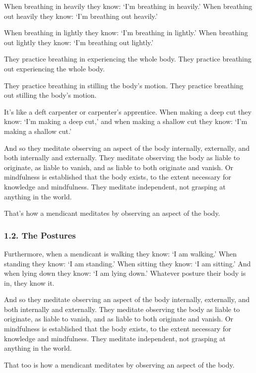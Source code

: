 \documentclass[12pt,openany]{book}%
\begin{document}
When breathing in heavily they know: ‘I’m breathing in heavily.’ When breathing out heavily they know: ‘I’m breathing out heavily.’ 

When breathing in lightly they know: ‘I’m breathing in lightly.’ When breathing out lightly they know: ‘I’m breathing out lightly.’ 

They practice breathing in experiencing the whole body. They practice breathing out experiencing the whole body. 

They practice breathing in stilling the body’s motion. They practice breathing out stilling the body’s motion. 

It’s like a deft carpenter or carpenter’s apprentice. When making a deep cut they know: ‘I’m making a deep cut,’ and when making a shallow cut they know: ‘I’m making a shallow cut.’ 

And so they meditate observing an aspect of the body internally, externally, and both internally and externally. They meditate observing the body as liable to originate, as liable to vanish, and as liable to both originate and vanish. Or mindfulness is established that the body exists, to the extent necessary for knowledge and mindfulness. They meditate independent, not grasping at anything in the world. 

That’s how a mendicant meditates by observing an aspect of the body. 

\subsubsection*{1.2. The Postures }

Furthermore, when a mendicant is walking they know: ‘I am walking.’ When standing they know: ‘I am standing.’ When sitting they know: ‘I am sitting.’ And when lying down they know: ‘I am lying down.’ Whatever posture their body is in, they know it. 

And so they meditate observing an aspect of the body internally, externally, and both internally and externally. They meditate observing the body as liable to originate, as liable to vanish, and as liable to both originate and vanish. Or mindfulness is established that the body exists, to the extent necessary for knowledge and mindfulness. They meditate independent, not grasping at anything in the world. 

That too is how a mendicant meditates by observing an aspect of the body. 
\end{document}
